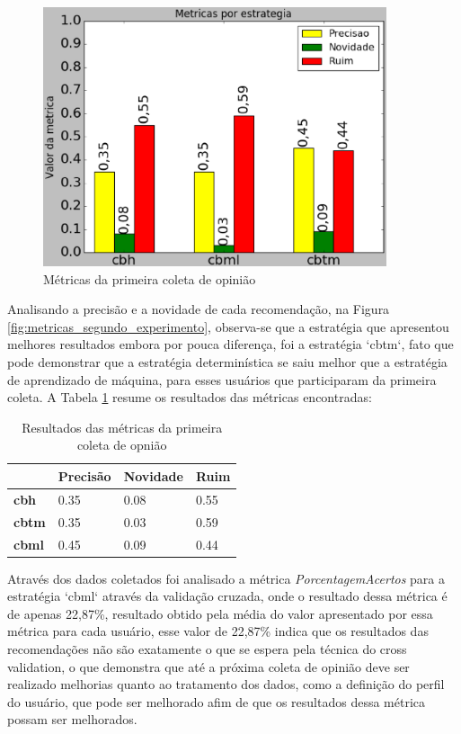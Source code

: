 \pagebreak

\begin{figure}[h]
  \centering
  \includegraphics[width=0.9\textwidth]{figuras/metricas_primeiro_experimento.eps}
  \caption{Métricas da primeira coleta de opinião}
  \label{fig:metricas_primeiro_experimento}
\end{figure}

Analisando a precisão e a novidade de cada recomendação, na Figura
\ref{fig:metricas_segundo_experimento}, observa-se que a estratégia que
apresentou melhores resultados embora por pouca diferença, foi a estratégia
`cbtm`, fato que pode demonstrar que a estratégia determinística se saiu melhor
que a estratégia de aprendizado de máquina, para esses usuários que
participaram da primeira coleta. A Tabela \ref{tab:resultado_p1} resume os
resultados das métricas encontradas:

\begin{table}[]
    \centering
    \begin{tabular}{|l|l|l|l|}
    \hline
    & \textbf{Precisão} & \textbf{Novidade} & \textbf{Ruim} \\ \hline
    \textbf{cbh}  & 0.35     & 0.08     & 0.55 \\ \hline
    \textbf{cbtm} & 0.35     & 0.03     & 0.59 \\ \hline
    \textbf{cbml} & 0.45     & 0.09     & 0.44 \\ \hline
    \end{tabular}
    \caption{Resultados das métricas da primeira coleta de opnião}
    \label{tab:resultado_p1}
\end{table}

Através dos dados coletados foi analisado a métrica \textit{PorcentagemAcertos}
para a estratégia `cbml` através da validação cruzada, onde o resultado dessa
métrica é de apenas 22,87\%, resultado obtido pela média do valor apresentado
por essa métrica para cada usuário, esse valor de 22,87\% indica que os
resultados das recomendações não são exatamente o que se espera pela técnica
do cross validation, o que demonstra que até a próxima coleta de opinião deve ser
realizado melhorias quanto ao tratamento dos dados, como a definição do perfil
do usuário, que pode ser melhorado afim de que os resultados dessa métrica
possam ser melhorados.

